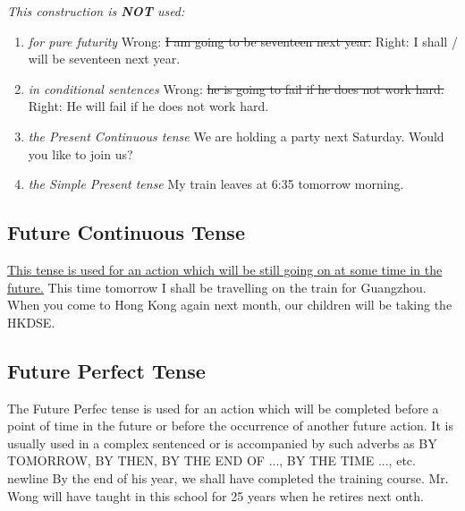 \begin{enumerate}
\begin{enumerate}
\begin{enumerate}
                \end{enumerate}
                {\it This construction is {\bf NOT} used:}
                \begin{enumerate}
                    \item {\it for pure futurity}
                        \newline
                        Wrong: \st{I am going to be seventeen next year.}
                        \newline
                        Right: I shall / will be seventeen next year.
                    \item {\it in conditional sentences}
                        \newline
                        Wrong: \st{he is going to fail if he does not work
                        hard.}
                        \newline
                        Right: He will fail if he does not work hard.
                    \item {\it the Present Continuous tense}
                        \newline
                        We are holding a party next Saturday. Would you like to
                        join us?
                    \item {\it the Simple Present tense}
                        \newline
                        My train leaves at 6:35 tomorrow morning.
                \end{enumerate}
        \end{enumerate}
\end{enumerate}

\newpage
\subsection{Future Continuous Tense}
\underline{This tense is used for an action which will be still going on at some
time in the future.}
\newline
\newline
This time tomorrow I shall be travelling on the train for Guangzhou.
\newline
When you come to Hong Kong again next month, our children will be taking the
HKDSE.

\subsection{Future Perfect Tense}
The Future Perfec tense is used for an action which will be completed before a
point of time in the future or before the occurrence of another future action.
It is usually used in a complex sentenced or is accompanied by such adverbs as
BY TOMORROW, BY THEN, BY THE END OF ..., BY THE TIME ..., etc.
\newline
newline
By the end of his year, we shall have completed the training course.
\newline
Mr. Wong will have taught in this school for 25 years when he retires next onth.

